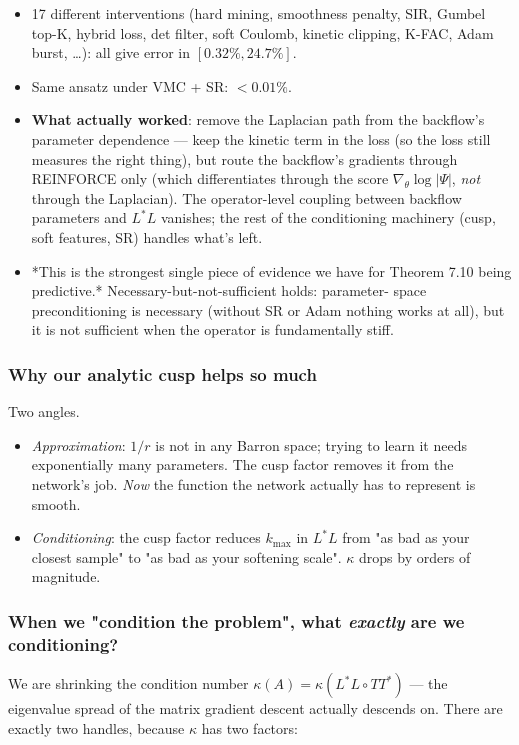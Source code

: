 \documentclass[11pt]{article}
\begin{document}
\begin{itemize}
\item 17 different interventions (hard mining, smoothness penalty, SIR,
Gumbel top-K, hybrid loss, det filter, soft Coulomb, kinetic clipping,
K-FAC, Adam burst, \ldots{}): all give error in $[0.32\%, 24.7\%]$.
\item Same ansatz under VMC + SR: $< 0.01\%$.
\item \textbf{What actually worked}: remove the Laplacian path from the backflow's
parameter dependence --- keep the kinetic term in the loss (so the loss
still measures the right thing), but route the backflow's gradients
through REINFORCE only (which differentiates through the score
$\nabla_\theta \log |\Psi|$, \emph{not} through the Laplacian). The
operator-level coupling between backflow parameters and $L^* L$ vanishes;
the rest of the conditioning machinery (cusp, soft features, SR) handles
what's left.
\item *This is the strongest single piece of evidence we have for Theorem
7.10 being predictive.* Necessary-but-not-sufficient holds: parameter-
space preconditioning is necessary (without SR or Adam nothing works at
all), but it is not sufficient when the operator is fundamentally stiff.
\end{itemize}
\subsubsection*{Why our analytic cusp helps so much}

Two angles.

\begin{itemize}
\item \emph{Approximation}: $1/r$ is not in any Barron space; trying to learn it
needs exponentially many parameters. The cusp factor removes it from
the network's job. \emph{Now} the function the network actually has to
represent is smooth.
\item \emph{Conditioning}: the cusp factor reduces $k_{\max}$ in $L^* L$ from
"as bad as your closest sample" to "as bad as your softening scale".
$\kappa$ drops by orders of magnitude.
\end{itemize}
\subsubsection*{When we "condition the problem", what \emph{exactly} are we conditioning?}

We are shrinking the condition number $\kappa(A) = \kappa(L^*L \circ
TT^*)$ --- the eigenvalue spread of the matrix gradient descent actually
descends on. There are exactly two handles, because $\kappa$ has two
factors:
\end{document}
